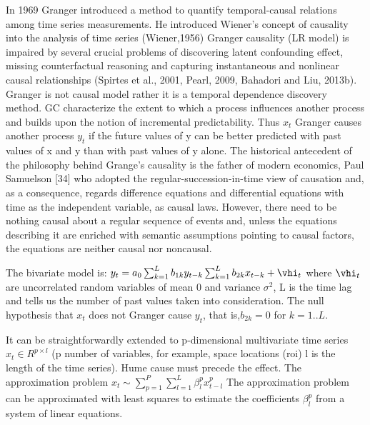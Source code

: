 \documentclass[onecollarge,runningheads]{svjour2}
\begin{document}
In 1969 Granger introduced a method to quantify temporal-causal relations among time series measurements. He introduced Wiener’s concept of causality into the analysis of time series (Wiener,1956)
Granger causality (LR model) is impaired by several crucial problems of discovering latent confounding effect, missing counterfactual reasoning and capturing instantaneous and nonlinear causal relationships (Spirtes et al., 2001, Pearl, 2009, Bahadori and Liu, 2013b).
Granger is not causal model rather it is a temporal dependence discovery method.
GC characterize the extent to which a process influences another process and builds upon the notion of incremental predictability. Thus $x_t$ Granger causes another process $y_t$ if the future values of y can be better predicted with past values of x and y than with past values of y alone.
The historical antecedent of the philosophy behind Grange's causality is the father of modern economics, Paul Samuelson [34] who adopted the regular-succession-in-time view of causation  and, as a consequence, regards difference equations and differential equations with time as the independent variable, as causal laws. 
However, there need to be nothing causal about a regular sequence of events and, unless the equations describing it are enriched with semantic assumptions pointing to causal factors, the equations are neither causal nor noncausal. 


The bivariate model is:
$y_t = a_0 \sum_{k=1}^{L}b_{1k}y_{t-k} \sum_{k=1}^{L}b_{2k}x_{t-k} + \vhi_t$
where $\vhi_t$ are uncorrelated random  variables of mean 0 and variance $\sigma^2$, L is the time lag and tells us the number of past values taken into consideration. The null hypothesis that $x_t$ does not Granger cause $y_t$, that is,$b_{2k} = 0$ for $k=1..L$.

It can be straightforwardly extended to p-dimensional multivariate time series $x_t \in R^{p \times l }$ (p number of variables, for example, space locations (roi) l is the length of the time series).
Hume cause must precede the effect.
The approximation problem
$x_t \sim \sum_{p=1}^{P} \sum_{l=1}^{L}\beta_{l}^{p} x_{t-l}^{p}$
The approximation problem can be approximated with least squares to estimate the coefficients $\beta_{l}^{p}$ from a system of linear equations.
\end{document}
